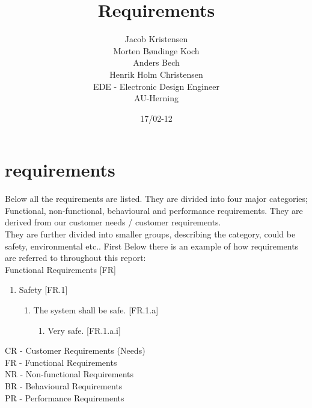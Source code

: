 \documentclass[12pt,a4paper]{report}
\title{Requirements}
\author{Jacob Kristensen\\Morten Bøndinge Koch\\Anders Bech\\ Henrik Holm Christensen\\EDE - Electronic Design Engineer\\AU-Herning\\}
\date{17/02-12}
\begin{document}
\chapter{requirements}
Below all the requirements are listed. They are divided into four major categories; Functional, non-functional, behavioural and performance requirements. They are derived from our customer needs / customer requirements.\\
They are further divided into smaller groups, describing the category, could be safety, environmental etc.. First Below there is an example of how requirements are referred to throughout this report:\\

Functional Requirements [FR]
\begin{enumerate}
\item Safety [FR.1]
\begin{enumerate}
	\item The system shall be safe. [FR.1.a]
	\begin{enumerate}
		\item Very safe. [FR.1.a.i]
	\end{enumerate}
\end{enumerate}
\end{enumerate}
CR - Customer Requirements (Needs)\\
FR - Functional Requirements\\
NR - Non-functional Requirements\\
BR - Behavioural Requirements\\
PR - Performance Requirements\\ 
\end{document}
